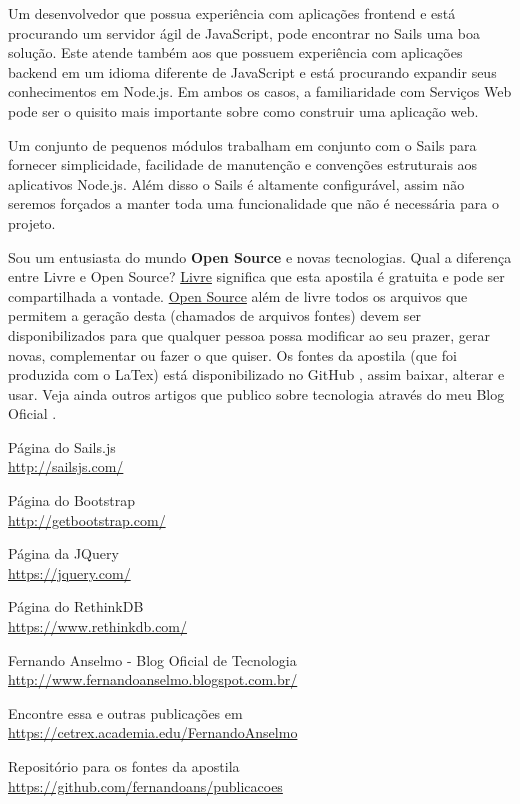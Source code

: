\documentclass[a4paper,11pt]{article}
\begin{document}
Um desenvolvedor que possua experiência com aplicações frontend e está procurando um servidor ágil de JavaScript, pode encontrar no Sails uma boa solução. Este atende também aos que possuem experiência com aplicações backend em um idioma diferente de JavaScript e está procurando expandir seus conhecimentos em Node.js. Em ambos os casos, a familiaridade com Serviços Web pode ser o quisito mais importante sobre como construir uma aplicação web.

Um conjunto de pequenos módulos trabalham em conjunto com o Sails para fornecer simplicidade, facilidade de manutenção e convenções estruturais aos aplicativos Node.js. Além disso o Sails é altamente configurável, assim não seremos forçados a manter toda uma funcionalidade que não é necessária para o projeto. 

Sou um entusiasta do mundo \textbf{Open Source} e novas tecnologias. Qual a diferença entre Livre e Open Source? \underline{Livre} significa que esta apostila é gratuita e pode ser compartilhada a vontade. \underline{Open Source} além de livre todos os arquivos que permitem a geração desta (chamados de arquivos fontes) devem ser disponibilizados para que qualquer pessoa possa modificar ao seu prazer, gerar novas, complementar ou fazer o que quiser. Os fontes da apostila (que foi produzida com o LaTex) está disponibilizado no GitHub \cite{github}, assim baixar, alterar e usar. Veja ainda outros artigos que publico sobre tecnologia através do meu Blog Oficial \cite{fernandoanselmo}.

\begin{thebibliography}{7}
  Página do Sails.js \\
  \url{http://sailsjs.com/}

  Página do Bootstrap \\
  \url{http://getbootstrap.com/}

  Página da JQuery \\
  \url{https://jquery.com/}

  Página do RethinkDB \\
  \url{https://www.rethinkdb.com/}

  Fernando Anselmo - Blog Oficial de Tecnologia \\
  \url{http://www.fernandoanselmo.blogspot.com.br/}

  Encontre essa e outras publicações em \\
  \url{https://cetrex.academia.edu/FernandoAnselmo}

  Repositório para os fontes da apostila \\
  \url{https://github.com/fernandoans/publicacoes}
\end{thebibliography}
  
\end{document}
